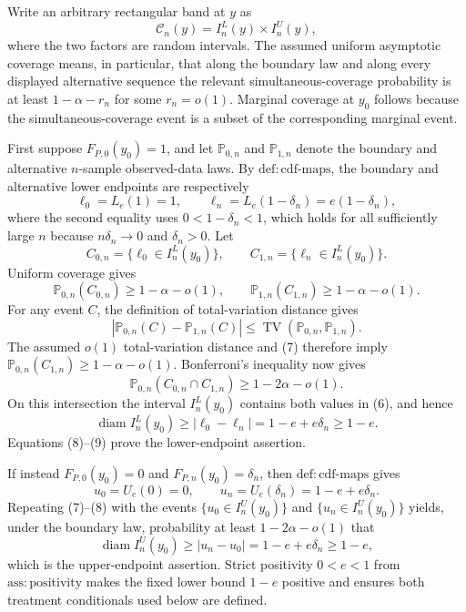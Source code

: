 Write an arbitrary rectangular band at \(y\) as
\[
 \mathcal C_n(y)=I_n^L(y)\times I_n^U(y),
\]
where the two factors are random intervals.  The assumed uniform asymptotic coverage means, in particular, that along the boundary law and along every displayed alternative sequence the relevant simultaneous-coverage probability is at least \(1-\alpha-r_n\) for some \(r_n=o(1)\).  Marginal coverage at \(y_0\) follows because the simultaneous-coverage event is a subset of the corresponding marginal event.

First suppose \(F_{P,0}(y_0)=1\), and let \(\mathbb P_{0,n}\) and \(\mathbb P_{1,n}\) denote the boundary and alternative \(n\)-sample observed-data laws.  By \(\mathrm{def:cdf\text{-}maps}\), the boundary and alternative lower endpoints are respectively
\[
 \ell_0=L_e(1)=1,
 \qquad
 \ell_n=L_e(1-\delta_n)=e(1-\delta_n), \tag{6}
\]
where the second equality uses \(0<1-\delta_n<1\), which holds for all sufficiently large \(n\) because \(n\delta_n\to0\) and \(\delta_n>0\).  Let
\[
 C_{0,n}=\{\ell_0\in I_n^L(y_0)\},
 \qquad
 C_{1,n}=\{\ell_n\in I_n^L(y_0)\}.
\]
Uniform coverage gives
\[
 \mathbb P_{0,n}(C_{0,n})\ge1-\alpha-o(1),
 \qquad
 \mathbb P_{1,n}(C_{1,n})\ge1-\alpha-o(1). \tag{7}
\]
For any event \(C\), the definition of total-variation distance gives
\[
 |\mathbb P_{0,n}(C)-\mathbb P_{1,n}(C)|
 \le \operatorname{TV}(\mathbb P_{0,n},\mathbb P_{1,n}).
\]
The assumed \(o(1)\) total-variation distance and (7) therefore imply \(\mathbb P_{0,n}(C_{1,n})\ge1-\alpha-o(1)\).  Bonferroni's inequality now gives
\[
 \mathbb P_{0,n}(C_{0,n}\cap C_{1,n})
 \ge1-2\alpha-o(1). \tag{8}
\]
On this intersection the interval \(I_n^L(y_0)\) contains both values in (6), and hence
\[
 \operatorname{diam} I_n^L(y_0)
 \ge |\ell_0-\ell_n|
 =1-e+e\delta_n
 \ge1-e. \tag{9}
\]
Equations (8)--(9) prove the lower-endpoint assertion.

If instead \(F_{P,0}(y_0)=0\) and \(F_{P,n}(y_0)=\delta_n\), then \(\mathrm{def:cdf\text{-}maps}\) gives
\[
 u_0=U_e(0)=0,
 \qquad
 u_n=U_e(\delta_n)=1-e+e\delta_n. \tag{10}
\]
Repeating (7)--(8) with the events \(\{u_0\in I_n^U(y_0)\}\) and \(\{u_n\in I_n^U(y_0)\}\) yields, under the boundary law, probability at least \(1-2\alpha-o(1)\) that
\[
 \operatorname{diam}I_n^U(y_0)
 \ge |u_n-u_0|
 =1-e+e\delta_n
 \ge1-e, \tag{11}
\]
which is the upper-endpoint assertion.  Strict positivity \(0<e<1\) from \(\mathrm{ass:positivity}\) makes the fixed lower bound \(1-e\) positive and ensures both treatment conditionals used below are defined.

